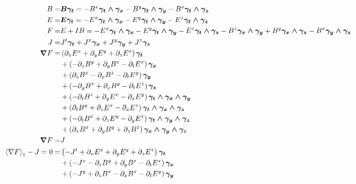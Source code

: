 \documentclass[letterpaper,10pt,english]{sphinxmanual}
\begin{document}
  \begin{align*}
  B =& \bm{B\gamma_{t}} = - B^{x}\bm{\gamma_{t}\W \gamma_{x}}- B^{y}\bm{\gamma_{t}\W \gamma_{y}}- B^{z}\bm{\gamma_{t}\W \gamma_{z}} \\
  E =& \bm{E\gamma_{t}} = - E^{x}\bm{\gamma_{t}\W \gamma_{x}}- E^{y}\bm{\gamma_{t}\W \gamma_{y}}- E^{z}\bm{\gamma_{t}\W \gamma_{z}} \\
  F =& E+IB = - E^{x}\bm{\gamma_{t}\W \gamma_{x}}- E^{y}\bm{\gamma_{t}\W \gamma_{y}}- E^{z}\bm{\gamma_{t}\W \gamma_{z}}- B^{z}\bm{\gamma_{x}\W \gamma_{y}}+B^{y}\bm{\gamma_{x}\W \gamma_{z}}- B^{x}\bm{\gamma_{y}\W \gamma_{z}} \\
  J =& J^{t}\bm{\gamma_{t}}+J^{x}\bm{\gamma_{x}}+J^{y}\bm{\gamma_{y}}+J^{z}\bm{\gamma_{z}} \\
  \bm{\nabla}  F =& \left ( \partial_{x} E^{x} + \partial_{y} E^{y} + \partial_{z} E^{z}\right ) \bm{\gamma_{t}} \\
  & +\left ( - \partial_{z} B^{y} + \partial_{y} B^{z} - \partial_{t} E^{x}\right ) \bm{\gamma_{x}} \\
  & +\left ( \partial_{z} B^{x} - \partial_{x} B^{z} - \partial_{t} E^{y}\right ) \bm{\gamma_{y}} \\
  & +\left ( - \partial_{y} B^{x} + \partial_{x} B^{y} - \partial_{t} E^{z}\right ) \bm{\gamma_{z}} \\
  & +\left ( - \partial_{t} B^{z} + \partial_{y} E^{x} - \partial_{x} E^{y}\right ) \bm{\gamma_{t}\W \gamma_{x}\W \gamma_{y}} \\
  & +\left ( \partial_{t} B^{y} + \partial_{z} E^{x} - \partial_{x} E^{z}\right ) \bm{\gamma_{t}\W \gamma_{x}\W \gamma_{z}} \\
  & +\left ( - \partial_{t} B^{x} + \partial_{z} E^{y} - \partial_{y} E^{z}\right ) \bm{\gamma_{t}\W \gamma_{y}\W \gamma_{z}} \\
  & +\left ( \partial_{x} B^{x} + \partial_{y} B^{y} + \partial_{z} B^{z}\right ) \bm{\gamma_{x}\W \gamma_{y}\W \gamma_{z}} \\
  \bm{\nabla}  F =& J \\
  \grade{\nabla F}_{1} -J = 0 =  & \left ( - J^{t} + \partial_{x} E^{x} + \partial_{y} E^{y} + \partial_{z} E^{z}\right ) \bm{\gamma_{t}} \\
  & +\left ( - J^{x} - \partial_{z} B^{y} + \partial_{y} B^{z} - \partial_{t} E^{x}\right ) \bm{\gamma_{x}} \\
  & +\left ( - J^{y} + \partial_{z} B^{x} - \partial_{x} B^{z} - \partial_{t} E^{y}\right ) \bm{\gamma_{y}} \\

\end{align*}
\end{document}
